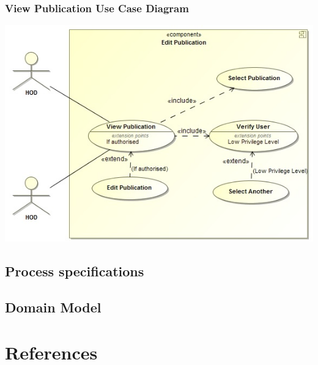 \documentclass[a4paper,12pt]{article}
\begin{document}
	\subsubsection{View Publication Use Case Diagram}
	\includegraphics[width=1\textwidth]{./ViewPublication.jpg}\\[1.5cm]
		
\subsection{Process specifications}
\subsection{Domain Model}

\newpage
\section{References}
\end{document}
